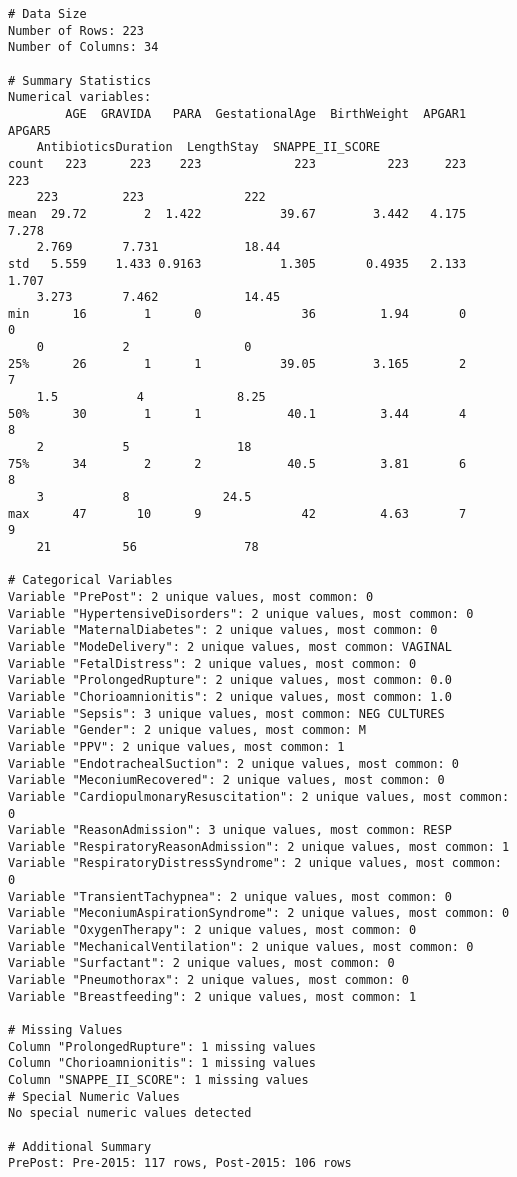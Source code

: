 \documentclass[11pt]{article}
\begin{document}
\begin{Verbatim}[tabsize=4]
# Data Size
Number of Rows: 223
Number of Columns: 34

# Summary Statistics
Numerical variables:
        AGE  GRAVIDA   PARA  GestationalAge  BirthWeight  APGAR1  APGAR5
	AntibioticsDuration  LengthStay  SNAPPE_II_SCORE
count   223      223    223             223          223     223     223
	223         223              222
mean  29.72        2  1.422           39.67        3.442   4.175   7.278
	2.769       7.731            18.44
std   5.559    1.433 0.9163           1.305       0.4935   2.133   1.707
	3.273       7.462            14.45
min      16        1      0              36         1.94       0       0
	0           2                0
25%      26        1      1           39.05        3.165       2       7
	1.5           4             8.25
50%      30        1      1            40.1         3.44       4       8
	2           5               18
75%      34        2      2            40.5         3.81       6       8
	3           8             24.5
max      47       10      9              42         4.63       7       9
	21          56               78

# Categorical Variables
Variable "PrePost": 2 unique values, most common: 0
Variable "HypertensiveDisorders": 2 unique values, most common: 0
Variable "MaternalDiabetes": 2 unique values, most common: 0
Variable "ModeDelivery": 2 unique values, most common: VAGINAL
Variable "FetalDistress": 2 unique values, most common: 0
Variable "ProlongedRupture": 2 unique values, most common: 0.0
Variable "Chorioamnionitis": 2 unique values, most common: 1.0
Variable "Sepsis": 3 unique values, most common: NEG CULTURES
Variable "Gender": 2 unique values, most common: M
Variable "PPV": 2 unique values, most common: 1
Variable "EndotrachealSuction": 2 unique values, most common: 0
Variable "MeconiumRecovered": 2 unique values, most common: 0
Variable "CardiopulmonaryResuscitation": 2 unique values, most common: 0
Variable "ReasonAdmission": 3 unique values, most common: RESP
Variable "RespiratoryReasonAdmission": 2 unique values, most common: 1
Variable "RespiratoryDistressSyndrome": 2 unique values, most common: 0
Variable "TransientTachypnea": 2 unique values, most common: 0
Variable "MeconiumAspirationSyndrome": 2 unique values, most common: 0
Variable "OxygenTherapy": 2 unique values, most common: 0
Variable "MechanicalVentilation": 2 unique values, most common: 0
Variable "Surfactant": 2 unique values, most common: 0
Variable "Pneumothorax": 2 unique values, most common: 0
Variable "Breastfeeding": 2 unique values, most common: 1

# Missing Values
Column "ProlongedRupture": 1 missing values
Column "Chorioamnionitis": 1 missing values
Column "SNAPPE_II_SCORE": 1 missing values
# Special Numeric Values
No special numeric values detected

# Additional Summary
PrePost: Pre-2015: 117 rows, Post-2015: 106 rows

\end{Verbatim}
\end{document}
